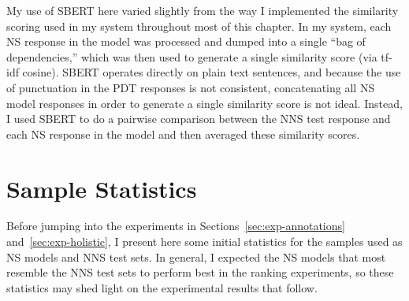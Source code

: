 My use of SBERT here varied slightly from the way I implemented the similarity scoring used in my system throughout most of this chapter. In my system, each NS response in the model was processed and dumped into a single ``bag of dependencies,'' which was then used to generate a single similarity score (via tf-idf cosine). SBERT operates directly on plain text sentences, and because the use of punctuation in the PDT responses is not consistent, concatenating all NS model responses in order to generate a single similarity score is not ideal. Instead, I used SBERT to do a pairwise comparison between the NNS test response and each NS response in the model and then averaged these similarity scores.


\section{Sample Statistics}
\label{sec:sample-stats}
Before jumping into the experiments in Sections~\ref{sec:exp-annotations} and~\ref{sec:exp-holistic}, I present here some initial statistics for the samples used as NS models and NNS test sets. In general, I expected the NS models that most resemble the NNS test sets to perform best in the ranking experiments, so these statistics may shed light on the experimental results that follow.

